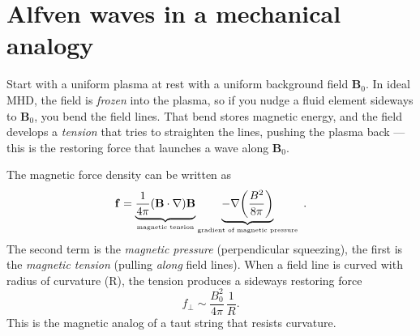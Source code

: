 
\section{Alfven waves in a mechanical analogy}

Start with a uniform plasma at rest with a uniform background field \(\mathbf B_0\). In ideal MHD, the field is \emph{frozen} into the plasma, so if you nudge a fluid element sideways to \(\mathbf B_0\), you bend the field lines. That bend stores magnetic energy, and the field develops a \emph{tension} that tries to straighten the lines, pushing the plasma back — this is the restoring force that launches a wave along \(\mathbf B_0\). 


The magnetic force density can be written as
\[
\mathbf f = \underbrace{\frac{1}{4\pi}(\mathbf B\cdot\nabla)\mathbf B}_{\text{\tiny magnetic tension}} \underbrace{- \nabla\!\left(\frac{B^2}{8\pi}\right)}_{\text{\tiny gradient of magnetic pressure}}~.
\]
The second term is the \emph{magnetic pressure} (perpendicular squeezing), the first is the \emph{magnetic tension} (pulling \emph{along} field lines). When a field line is curved with radius of curvature (R), the tension produces a sideways restoring force
\[
f_{\perp} \sim \frac{B_0^2}{4\pi} \, \frac{1}{R}.
\]
This is the magnetic analog of a taut string that resists curvature.


%
%
%

